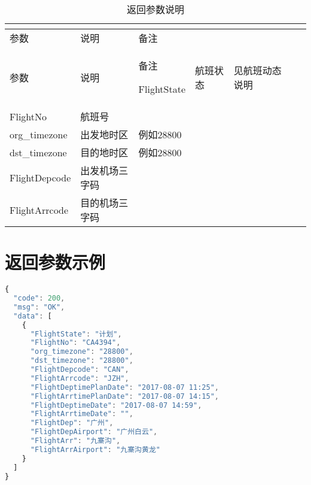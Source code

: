 \begin{longtable}{|m{100pt}|m{100pt}|m{180pt}|}
\tabularnewline\hline
参数&说明&备注
\endhead

\caption{返回参数说明}\\
\hline
参数&说明&备注
\endfirsthead

\endfoot

\endlastfoot
\hline
FlightState & 航班状态 & 见航班动态说明\\
\hline
FlightNo &航班号 & \\
\hline
org\_timezone &出发地时区&例如28800\\
\hline
dst\_timezone &目的地时区&例如28800\\
\hline
FlightDepcode &出发机场三字码\\
\hline
FlightArrcode &目的机场三字码&\\
\hline
\end{longtable}

\section{返回参数示例}



\begin{lstlisting}[language=JavaScript]
{
  "code": 200,
  "msg": "OK",
  "data": [
    {
      "FlightState": "计划",
      "FlightNo": "CA4394",
      "org_timezone": "28800",
      "dst_timezone": "28800",
      "FlightDepcode": "CAN",
      "FlightArrcode": "JZH",
      "FlightDeptimePlanDate": "2017-08-07 11:25",
      "FlightArrtimePlanDate": "2017-08-07 14:15",
      "FlightDeptimeDate": "2017-08-07 14:59",
      "FlightArrtimeDate": "",
      "FlightDep": "广州",
      "FlightDepAirport": "广州白云",
      "FlightArr": "九寨沟",
      "FlightArrAirport": "九寨沟黄龙"
    }
  ]
}
\end{lstlisting}







